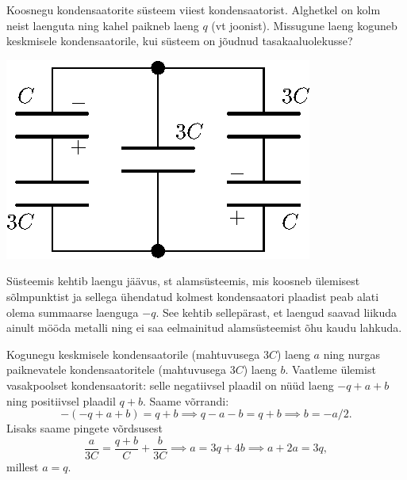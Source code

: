 
Koosnegu kondensaatorite süsteem viiest kondensaatorist. Alghetkel on kolm neist laenguta ning kahel paikneb laeng $q$ (vt joonist). Missugune laeng koguneb keskmisele kondensaatorile, kui süsteem on jõudnud tasakaaluolekusse?

\begin{center}
	\includegraphics[width=0.42\linewidth]{2009-v3g-03-G_kondensaatorid.eps}
\end{center}

\hint
Süsteemis kehtib laengu jäävus, st alamsüsteemis, mis koosneb ülemisest sõlmpunktist ja sellega ühendatud kolmest kondensaatori plaadist peab alati olema summaarse laenguga $-q$. See kehtib sellepärast, et laengud saavad liikuda ainult mööda metalli ning ei saa eelmainitud alamsüsteemist õhu kaudu lahkuda.

\solu
Kogunegu keskmisele kondensaatorile (mahtuvusega $3C$) laeng $a$ ning nurgas paiknevatele kondensaatoritele (mahtuvusega $3C$) laeng $b$. Vaatleme ülemist vasakpoolset kondensaatorit: selle negatiivsel plaadil on nüüd laeng $-q+a+b$ ning positiivsel plaadil $q+b$. Saame võrrandi:
\[-(-q+a+b)=q+b \implies q-a-b=q+b \implies b=-a/2.\]
Lisaks saame pingete võrdsusest
\[\frac{a}{3C}=\frac{q+b}{C}+\frac{b}{3C}\implies a=3q+4b\implies a+2a=3q,\]
millest $a=q$.
\probend